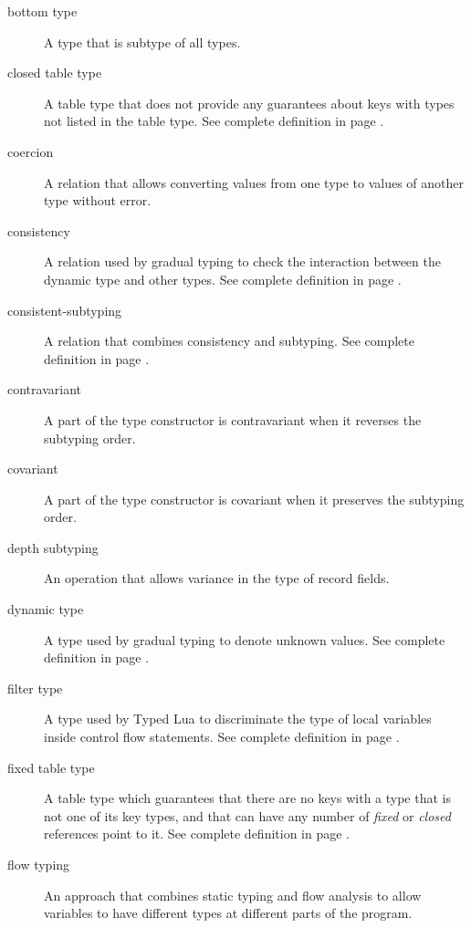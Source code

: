 \begin{description}
\item[bottom type] A type that is subtype of all types.

\item[closed table type] A table type that does not provide any guarantees
about keys with types not listed in the table type.
See complete definition in page \pageref{def:tabletype}.

\item[coercion] A relation that allows converting values from one type to
values of another type without error.

\item[consistency] A relation used by gradual typing to check the interaction
between the dynamic type and other types.
See complete definition in page \pageref{def:consistency}.

\item[consistent-subtyping] A relation that combines consistency and subtyping.
See complete definition in page \pageref{def:consistent-subtyping}.

\item[contravariant] A part of the type constructor is contravariant when
it reverses the subtyping order.

\item[covariant] A part of the type constructor is covariant when
it preserves the subtyping order.

\item[depth subtyping] An operation that allows variance in the type of
record fields.

\item[dynamic type] A type used by gradual typing to denote unknown values.
See complete definition in page \pageref{def:dynamictype}.

\item[filter type] A type used by Typed Lua to discriminate the type of
local variables inside control flow statements.
See complete definition in page \pageref{def:filtertype}.

\item[fixed table type] A table type which guarantees that there are no
keys with a type that is not one of its key types, and that can have
any number of \emph{fixed} or \emph{closed} references point to it.
See complete definition in page \pageref{def:tabletype}.

\item[flow typing] An approach that combines static typing and flow analysis to
allow variables to have different types at different parts of the program.


\end{description}
